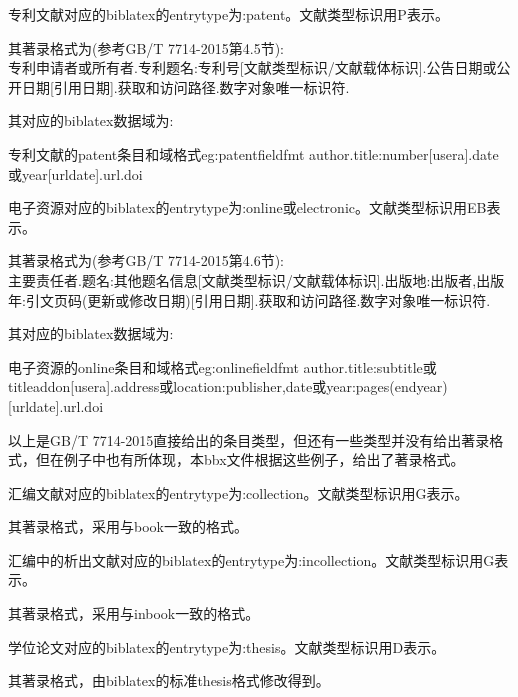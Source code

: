 \documentclass[11pt]{article} %
\begin{document}
\begin{refentry}{}{}
专利文献对应的biblatex的entrytype为:patent。文献类型标识用P表示。

其著录格式为(参考GB/T 7714-2015第4.5节):\\
专利申请者或所有者.专利题名:专利号[文献类型标识/文献载体标识].公告日期或公开日期[引用日期].获取和访问路径.数字对象唯一标识符.
\end{refentry}

其对应的biblatex数据域为:
\begin{codetex}{专利文献的patent条目和域格式}{eg:patentfieldfmt}
author.title:number[usera].date或year[urldate].url.doi
\end{codetex}

\begin{refentry}{}{}
电子资源对应的biblatex的entrytype为:online或electronic。文献类型标识用EB表示。

其著录格式为(参考GB/T 7714-2015第4.6节):\\
主要责任者.题名:其他题名信息[文献类型标识/文献载体标识].出版地:出版者,出版年:引文页码(更新或修改日期)[引用日期].获取和访问路径.数字对象唯一标识符.
\end{refentry}

其对应的biblatex数据域为:
\begin{codetex}{电子资源的online条目和域格式}{eg:onlinefieldfmt}
author.title:subtitle或titleaddon[usera].address或location:publisher,date或year:pages(endyear)[urldate].url.doi
\end{codetex}

以上是GB/T 7714-2015直接给出的条目类型，但还有一些类型并没有给出著录格式，但在例子中也有所体现，本bbx文件根据这些例子，给出了著录格式。
\begin{refentry}{}{}
汇编文献对应的biblatex的entrytype为:collection。文献类型标识用G表示。

其著录格式，采用与book一致的格式。
\end{refentry}

\begin{refentry}{}{}
汇编中的析出文献对应的biblatex的entrytype为:incollection。文献类型标识用G表示。

其著录格式，采用与inbook一致的格式。
\end{refentry}

\begin{refentry}{}{}
学位论文对应的biblatex的entrytype为:thesis。文献类型标识用D表示。

其著录格式，由biblatex的标准thesis格式修改得到。
\end{refentry}
\end{document}
